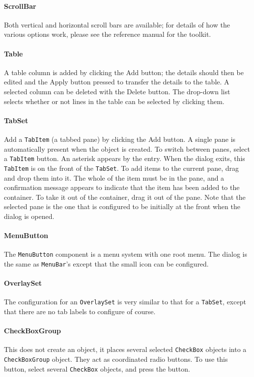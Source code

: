 \paragraph{ScrollBar}
Both vertical and horizontal scroll bars are available; for details of
how the various options work, please see the reference
manual for the toolkit.

\paragraph{Table}
A table column is added by clicking the Add button; the details should
then be edited and the Apply button pressed to transfer the details to
the table. A selected column can be deleted with the Delete button. The
drop-down list selects whether or not lines in the table can be
selected by clicking them.

\paragraph[TabSet]{TabSet}
Add a \texttt{TabItem} (a tabbed pane) by clicking the Add button.
A single pane is automatically present when the object is created.
To switch between panes, select a \texttt{TabItem} button. An asterisk
appears by the entry. When the dialog exits, this
\texttt{TabItem} is on the front of the \texttt{TabSet}. To add
items to the current pane, drag and drop them into it. The whole
of the item must be in the pane, and a confirmation message appears to
indicate that the item has been added to the container. To take it out
of the container, drag it out of the pane. Note that the selected
pane is the one that is configured to be initially at the front when
the dialog is opened.

\paragraph{MenuButton}
The \texttt{MenuButton} component is a menu system with one root
menu. The dialog is the same as \texttt{MenuBar}'s except that
the small icon can be configured.

\paragraph{OverlaySet}
The configuration for an \texttt{OverlaySet} is very similar to that for
a \texttt{TabSet}, except that there are no tab labels to configure of
course.

\paragraph{CheckBoxGroup}
This does not create an object, it
places several selected \texttt{CheckBox} objects into a
\texttt{CheckBoxGroup} object. They act as coordinated radio
buttons. To use this button, select several \texttt{CheckBox}
objects, and press the button.

